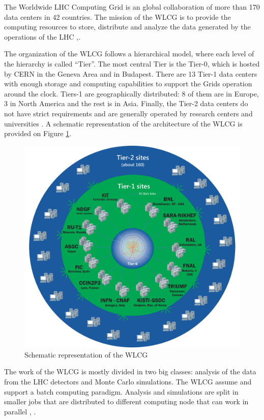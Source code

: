 The Worldwide LHC Computing Grid is an global collaboration of more than 170
data centers in 42 countries.  The mission of the WLCG is to provide the
computing resources to store, distribute and analyze the data generated by the
operations of the LHC \cite{grid:website},\cite{grid:report}.

The organization of the WLCG follows a hierarchical model, where each level of
the hierarchy is called “Tier”. The most central Tier is the Tier-0, which is
hosted by CERN in the Geneva Area and in Budapest. There are 13 Tier-1 data
centers with enough storage and computing capabilities to support the Grids
operation around the clock.
Tiers-1 are geographically distributed: 8 of them are in
Europe, 3 in North America and the rest is in Asia. Finally, the Tier-2 data
centers do not have strict requirements and are generally operated by research
centers and universities \cite{grid:report}.  A schematic representation of the
architecture of the WLCG is provided on Figure \ref{fig:wlcg-schema}.


\begin{figure}
\includegraphics[width=\textwidth,height=\textheight,keepaspectratio]{gfx/WLCG}
\caption{Schematic representation of the WLCG}
\label{fig:wlcg-schema}
\end{figure}

The work of the WLCG is mostly divided in two big classes: analysis of the data
from the LHC detectors and Monte Carlo simulations.  The WLCG assume and
support a batch computing paradigm. Analysis and simulations are split in
smaller jobs that are distributed to different computing node that can work in
parallel \cite{grid:report}, \cite{grid:update}.


